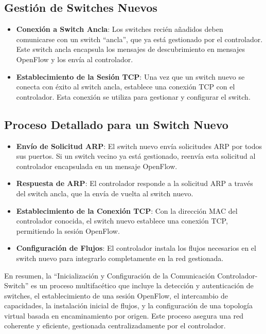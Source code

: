 \documentclass[a4paper, 12pt]{book}
\begin{document}
	\subsection{Gestión de Switches Nuevos}
	\begin{itemize}
		\item \textbf{Conexión a Switch Ancla}: Los switches recién añadidos deben comunicarse con un switch “ancla”, que ya está gestionado por el controlador. Este switch ancla encapsula los mensajes de descubrimiento en mensajes OpenFlow y los envía al controlador.
		\item \textbf{Establecimiento de la Sesión TCP}: Una vez que un switch nuevo se conecta con éxito al switch ancla, establece una conexión TCP con el controlador. Esta conexión se utiliza para gestionar y configurar el switch.
	\end{itemize}
	
	\subsection{Proceso Detallado para un Switch Nuevo}
	\begin{itemize}
		\item \textbf{Envío de Solicitud ARP}: El switch nuevo envía solicitudes ARP por todos sus puertos. Si un switch vecino ya está gestionado, reenvía esta solicitud al controlador encapsulada en un mensaje OpenFlow.
		\item \textbf{Respuesta de ARP}: El controlador responde a la solicitud ARP a través del switch ancla, que la envía de vuelta al switch nuevo.
		\item \textbf{Establecimiento de la Conexión TCP}: Con la dirección MAC del controlador conocida, el switch nuevo establece una conexión TCP, permitiendo la sesión OpenFlow.
		\item \textbf{Configuración de Flujos}: El controlador instala los flujos necesarios en el switch nuevo para integrarlo completamente en la red gestionada.
	\end{itemize}
	
	En resumen, la ``Inicialización y Configuración de la Comunicación Controlador-Switch'' es un proceso multifacético que incluye la detección y autenticación de switches, el establecimiento de una sesión OpenFlow, el intercambio de capacidades, la instalación inicial de flujos, y la configuración de una topología virtual basada en encaminamiento por origen. Este proceso asegura una red coherente y eficiente, gestionada centralizadamente por el controlador.
	
\end{document}
